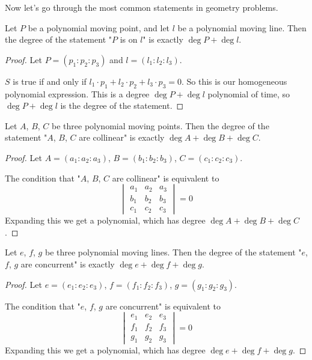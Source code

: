 \documentclass[a4paper]{article}
\begin{document}
Now let's go through the most common statements in geometry problems.

\begin{theorem}\label{point-line}
    Let $P$ be a polynomial moving point, and let $l$ be a polynomial moving line. Then the degree of the statement "$P$ is on $l$" is exactly $\deg P+ \deg l$.
\end{theorem}
\begin{proof}
    Let $P=(p_1:p_2:p_3)$ and $l=(l_1:l_2:l_3)$.

    $S$ is true if and only if $l_1\cdot p_1+l_2\cdot p_2+l_3\cdot p_3=0$. So this is our homogeneous polynomial expression. This is a degree $\deg P+\deg l$ polynomial of time, so $\deg P+\deg l$ is the degree of the statement.
\end{proof}

\begin{theorem}\label{deg3p}
    Let $A$, $B$, $C$ be three polynomial moving points. Then the degree of the statement "$A$, $B$, $C$ are collinear" is exactly $\deg A+ \deg B+ \deg C$.
\end{theorem}
\begin{proof}
    Let $A=(a_1:a_2:a_3)$, $B=(b_1:b_2:b_3)$, $C=(c_1:c_2:c_3)$.

    The condition that "$A$, $B$, $C$ are collinear" is equivalent to
    $$\begin{vmatrix}
    a_1 & a_2 & a_3\\[4pt]
    b_1 & b_2 & b_3\\[4pt]
    c_1 & c_2 & c_3
    \end{vmatrix}=0$$
    Expanding this we get a polynomial, which has degree $\deg A+ \deg B+ \deg C$.
\end{proof}

\begin{theorem}\label{concurrency}
    Let $e$, $f$, $g$ be three polynomial moving lines. Then the degree of the statement "$e$, $f$, $g$ are concurrent" is exactly $\deg e+ \deg f+ \deg g$.
\end{theorem}
\begin{proof}
    Let $e=(e_1:e_2:e_3)$, $f=(f_1:f_2:f_3)$, $g=(g_1:g_2:g_3)$.

    The condition that "$e$, $f$, $g$ are concurrent" is equivalent to
    $$\begin{vmatrix}
    e_1 & e_2 & e_3\\[4pt]
    f_1 & f_2 & f_3\\[4pt]
    g_1 & g_2 & g_3
    \end{vmatrix}=0$$
    Expanding this we get a polynomial, which has degree $\deg e+ \deg f+ \deg g$.
\end{proof}
\end{document}
